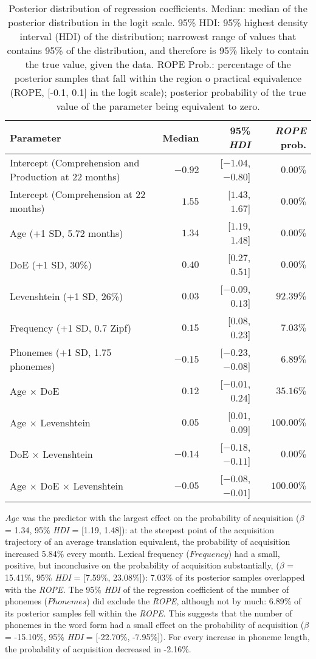 \documentclass[
  letterpaper,
  DIV=11,
  numbers=noendperiod]{scrartcl}
\begin{document}
\hypertarget{tbl-results-fixed}{}
\begin{longtable}{lrrr}
\caption{\label{tbl-results-fixed}Posterior distribution of regression coefficients. Median: median of the
posterior distribution in the logit scale. 95\% HDI: 95\% highest
density interval (HDI) of the distribution; narrowest range of values
that contains 95\% of the distribution, and therefore is 95\% likely to
contain the true value, given the data. ROPE Prob.: percentage of the
posterior samples that fall within the region o practical equivalence
(ROPE, {[}-0.1, 0.1{]} in the logit scale); posterior probability of the
true value of the parameter being equivalent to zero. }\tabularnewline

\toprule
Parameter & Median & 95\% \emph{HDI} & \emph{ROPE} prob. \\ 
\midrule
Intercept (Comprehension and Production at 22 months) & $-0.92$ & [$-1.04$, $-0.80$] & $0.00\%$ \\ 
Intercept (Comprehension at 22 months) & $1.55$ & [$1.43$, $1.67$] & $0.00\%$ \\ 
Age (+1 SD, 5.72 months) & $1.34$ & [$1.19$, $1.48$] & $0.00\%$ \\ 
DoE (+1 SD, 30\%) & $0.40$ & [$0.27$, $0.51$] & $0.00\%$ \\ 
Levenshtein (+1 SD, 26\%) & $0.03$ & [$-0.09$, $0.13$] & $92.39\%$ \\ 
Frequency (+1 SD, 0.7 Zipf) & $0.15$ & [$0.08$, $0.23$] & $7.03\%$ \\ 
Phonemes (+1 SD, 1.75 phonemes) & $-0.15$ & [$-0.23$, $-0.08$] & $6.89\%$ \\ 
Age × DoE & $0.12$ & [$-0.01$, $0.24$] & $35.16\%$ \\ 
Age × Levenshtein & $0.05$ & [$0.01$, $0.09$] & $100.00\%$ \\ 
DoE × Levenshtein & $-0.14$ & [$-0.18$, $-0.11$] & $0.00\%$ \\ 
Age × DoE × Levenshtein & $-0.05$ & [$-0.08$, $-0.01$] & $100.00\%$ \\ 
\bottomrule
\end{longtable}

\(Age\) was the predictor with the largest effect on the probability of
acquisition (\(\beta\) = 1.34, 95\% \emph{HDI} = {[}1.19, 1.48{]}): at
the steepest point of the acquisition trajectory of an average
translation equivalent, the probability of acquisition increased 5.84\%
every month. Lexical frequency (\(Frequency\)) had a small, positive,
but inconclusive on the probability of acquisition substantially,
(\(\beta\) = 15.41\%, 95\% \emph{HDI} = {[}7.59\%, 23.08\%{]}): 7.03\%
of its posterior samples overlapped with the \emph{ROPE.} The 95\%
\emph{HDI} of the regression coefficient of the number of phonemes
(\(Phonemes\)) did exclude the \emph{ROPE}, although not by much: 6.89\%
of its posterior samples fell within the \emph{ROPE}. This suggests that
the number of phonemes in the word form had a small effect on the
probability of acquisition (\(\beta\) = -15.10\%, 95\% \emph{HDI} =
{[}-22.70\%, -7.95\%{]}). For every increase in phoneme length, the
probability of acquisition decreased in -2.16\%.
\end{document}

